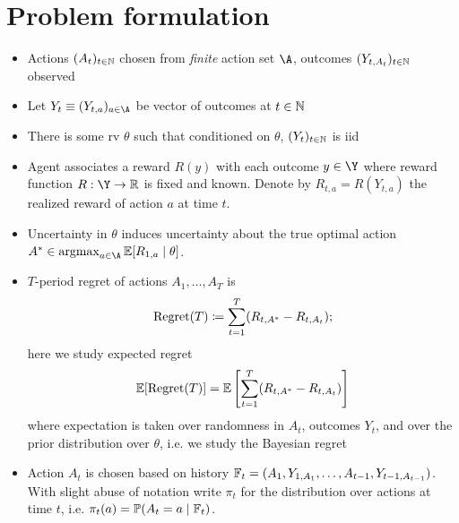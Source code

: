 \documentclass[11pt, openany]{book}
\DeclareMathOperator{\Regret}{Regret}
\begin{document}
\section{Problem formulation}
\begin{itemize}
    \item Actions $(A_t)_{t\in\mathbb{N}}$ chosen from \emph{finite} action set $\A$, outcomes $(Y_{t,A_t})_{t\in\mathbb{N}}$ observed
    \item Let $Y_t \equiv (Y_{t,a})_{a\in\A}$ be vector of outcomes at $t\in\mathbb{N}$
    \item There is some rv $\theta$ such that conditioned on $\theta$, $(Y_t)_{t\in\mathbb{N}}$ is iid
    \item Agent associates a reward $R(y)$ with each outcome $y\in\Y$ where reward function $R:\Y\to\R$ is fixed and known. Denote by $R_{t,a} = R(Y_{t,a})$ the realized reward of action $a$ at time $t$.
    \item Uncertainty in $\theta$ induces uncertainty about the true optimal action $A^*\in\argmax_{a\in\A} \E[R_{1,a}\given\theta]$.
    \item $T$-period regret of actions $A_1,\dots,A_T$ is
        \[
            \Regret(T) \defeq \sum_{t=1}^T (R_{t,A^*} - R_{t,A_t});
        \]
        here we study expected regret
        \[
            \E[\Regret(T)] = \E\left[ \sum_{t=1}^T (R_{t,A^*} - R_{t,A_t}) \right]
        \]
        where expectation is taken over randomness in $A_t$, outcomes $Y_t$, and over the prior distribution over $\theta$, i.e. we study the Bayesian regret
    \item Action $A_t$ is chosen based on history $\mathbb{F}_t = (A_1,Y_{1,A_1},\dots,A_{t-1},Y_{t-1,A_{t-1}})$. With slight abuse of notation write $\pi_t$ for the distribution over actions at time $t$, i.e. $\pi_t(a) = \mathbb{P}(A_t=a\mid\mathbb{F}_t)$.
\end{itemize}
\end{document}
